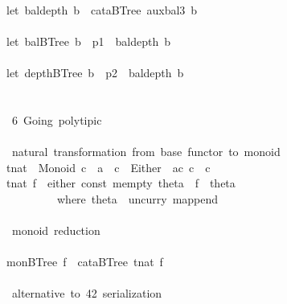 \documentclass[a4paper]{article}
\begin{document}
\begin{tabbing}
\ttfamily ~\\
\ttfamily ~let~baldepth~b~~cataBTree~auxbal3~b\\
\ttfamily ~\\
\ttfamily ~let~balBTree~b~~p1~~baldepth~b\\
\ttfamily ~\\
\ttfamily ~let~depthBTree~b~~p2~~baldepth~b\\
\ttfamily ~\\
\ttfamily ~\\
\ttfamily ~~6~Going~polytipic~\\
\ttfamily ~\\
\ttfamily ~~natural~transformation~from~base~functor~to~monoid\\
\ttfamily ~tnat~~Monoid~c~~a~~c~~Either~~ac~c~~c\\
\ttfamily ~tnat~f~~either~const~mempty~theta~~f~~theta\\
\ttfamily ~~~~~~~~~~where~theta~~uncurry~mappend\\
\ttfamily ~\\
\ttfamily ~~monoid~reduction~\\
\ttfamily ~\\
\ttfamily ~monBTree~f~~cataBTree~tnat~f\\
\ttfamily ~\\
\ttfamily ~~alternative~to~42~serialization~\\

\end{tabbing}
\end{document}
